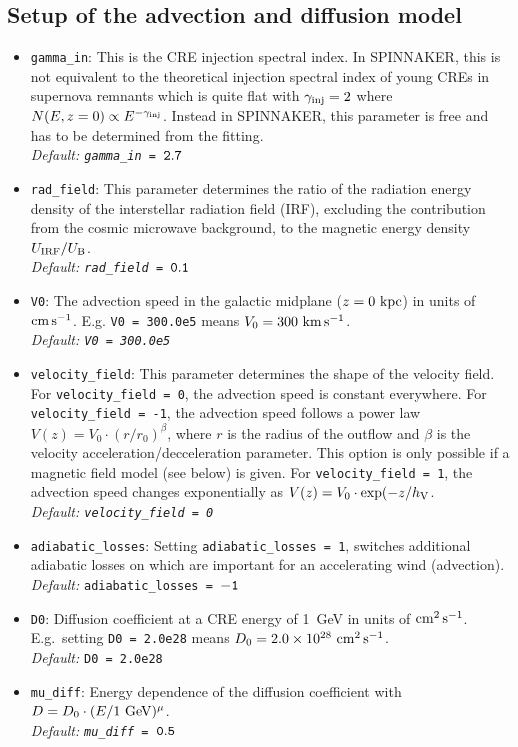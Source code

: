\documentclass[11pt,twocolumn,a4paper]{article}
\newcommand\spix{{\small SPINNAKER}}
\begin{document}
\subsection{Setup of the advection and diffusion model}
\begin{itemize}
\item {\tt gamma\_in}: This is the CRE injection spectral index. In \spix, this is not equivalent to the theoretical injection spectral index of young CREs in supernova remnants which is quite flat with $\gamma_{\rm inj}=2$ where $N(E,z=0)\propto E^{-\gamma_{\rm inj}}$. Instead in \spix, this parameter is free and has to be determined from the fitting.\\
\emph{Default: {\tt gamma\_in = $\tt 2.7$}}
\item {\tt rad\_field}: This parameter determines the ratio of the radiation energy density of the interstellar radiation field (IRF), excluding the contribution from the cosmic microwave background, to the magnetic energy density $U_{\rm IRF}/U_{\rm B}$.\\
\emph{Default: {\tt rad\_field = $\tt 0.1$}}
\item {\tt V0}: The advection speed in the galactic midplane ($z=0~\rm kpc$) in units of $\rm cm\,s^{-1}$. E.g. {\tt V0 = 300.0e5} means $V_0 = 300~\rm km\,s^{-1}$.\\
\emph{Default: {\tt V0 = 300.0e5}}
\item {\tt velocity\_field}: This parameter determines the shape of the velocity field. For {\tt velocity\_field = 0}, the advection speed is constant everywhere. For {\tt velocity\_field = -1}, the advection speed follows a power law $V(z)=V_0\cdot (r/r_0)^{\beta}$, where $r$ is the radius of the outflow and $\beta$ is the velocity acceleration/decceleration parameter. This option is only possible if a magnetic field model (see below) is given. For {\tt velocity\_field = 1}, the advection speed changes exponentially as $V(z) = V_0\cdot \exp(-z/h_{\rm V}$.\\
\emph{Default: {\tt velocity\_field = 0}}
\item {\tt adiabatic\_losses}: Setting {\tt adiabatic\_losses = 1}, switches additional adiabatic losses on which are important for an accelerating wind (advection).\\
\emph{Default:} {\tt adiabatic\_losses = $\tt -1$}
\item {\tt D0}: Diffusion coefficient at a CRE energy of 1~GeV in units of $\rm cm^{2}\,s^{-1}$. E.g.\ setting {\tt D0 = 2.0e28} means $D_0=2.0\times 10^{28}~\rm cm^2\,s^{-1}$.\\
\emph{Default:} {\tt D0 = 2.0e28}
\item {\tt mu\_diff}: Energy dependence of the diffusion coefficient with $D=D_0\cdot (E/1~{\rm GeV})^\mu$.\\
\emph{Default:} \emph{{\tt mu\_diff = $\tt 0.5$}}
\end{itemize}
\end{document}
